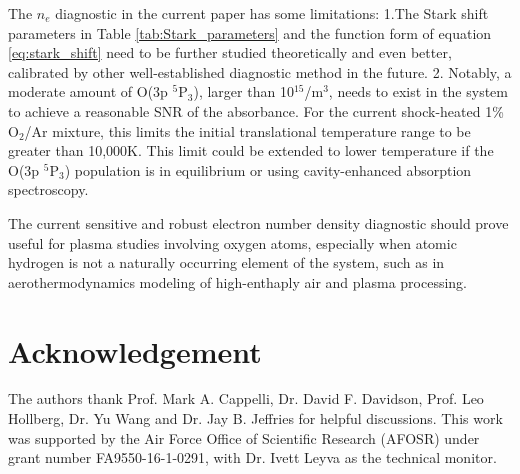 \documentclass[12pt]{iopart}
\begin{document}
The $n_e$ diagnostic in the current paper has some limitations: 1.The Stark shift parameters in Table \ref{tab:Stark_parameters} and the function form of equation \ref{eq:stark_shift} need to be further studied theoretically and even better, calibrated by other well-established diagnostic method in the future. 2. Notably, a moderate amount of O(3p $^5$P$_{3}$), larger than 10$^{15}$/m$^3$, needs to exist in the system to achieve a reasonable SNR of the absorbance. For the current shock-heated 1\% O$_2$/Ar mixture, this limits the initial translational temperature range to be greater than 10,000K. This limit could be extended to lower temperature if the  O(3p $^5$P$_{3}$) population is in equilibrium or using cavity-enhanced absorption spectroscopy.

The current sensitive and robust electron number density diagnostic should prove useful for plasma studies involving oxygen atoms, especially when atomic hydrogen is not a naturally occurring element of the system, such as in aerothermodynamics modeling of high-enthaply air and plasma processing.  


\section*{Acknowledgement}
The authors thank Prof. Mark A. Cappelli,  Dr. David F. Davidson, Prof. Leo Hollberg, Dr. Yu Wang and Dr. Jay B. Jeffries for helpful discussions.  This work was supported by the Air Force Office of Scientific Research (AFOSR) under grant number FA9550-16-1-0291, with Dr. Ivett Leyva as the technical monitor. 



\end{document}
